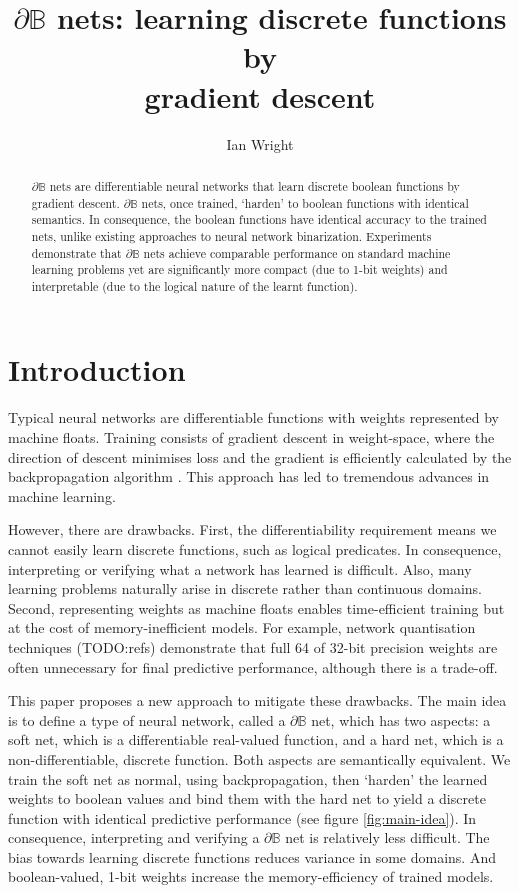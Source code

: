 \documentclass{article} %
\title{$\partial\mathbb{B}$ nets: learning discrete functions by\\gradient descent}
\author{Ian Wright}
\begin{document}
\maketitle

\begin{abstract}
	$\partial\mathbb{B}$ nets are differentiable neural networks 
	that learn discrete boolean functions by gradient descent.
	$\partial\mathbb{B}$ nets, once trained, `harden' to boolean functions with identical semantics. In consequence, the boolean functions have identical accuracy to the trained nets, unlike existing approaches to neural network binarization. Experiments demonstrate that $\partial\mathbb{B}$ nets achieve comparable performance on standard machine learning problems yet are significantly more compact (due to 1-bit weights) and interpretable (due to the logical nature of the learnt function).
\end{abstract}

\section{Introduction}

Typical neural networks are differentiable functions with weights represented by machine floats. Training consists of gradient descent in weight-space, where the direction of descent minimises loss and the gradient is efficiently calculated by the backpropagation algorithm \citep{rumelhart1986learning}. This approach has led to tremendous advances in machine learning.

However, there are drawbacks. First, the differentiability requirement means we cannot easily learn discrete functions, such as logical predicates. In consequence, interpreting or verifying what a network has learned is difficult. Also, many learning problems naturally arise in discrete rather than continuous domains. Second, representing weights as machine floats enables time-efficient training but at the cost of memory-inefficient models. For example, network quantisation techniques (TODO:refs) demonstrate that full 64 of 32-bit precision weights are often unnecessary for final predictive performance, although there is a trade-off.

This paper proposes a new approach to mitigate these drawbacks. The main idea is to define a type of neural network, called a $\partial \mathbb{B}$ net, which has two aspects: a soft net, which is a differentiable real-valued function, and a hard net, which is a non-differentiable, discrete function. Both aspects are semantically equivalent. We train the soft net as normal, using backpropagation, then `harden' the learned weights to boolean values and bind them with the hard net to yield a discrete function with identical predictive performance (see figure \ref{fig:main-idea}). In consequence, interpreting and verifying a $\partial \mathbb{B}$ net is relatively less difficult. The bias towards learning discrete functions reduces variance in some domains. And boolean-valued, 1-bit weights increase the memory-efficiency of trained models.
\end{document}
